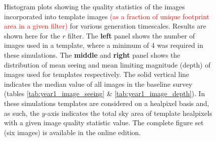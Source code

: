 \documentclass[preprintm,linenumbers]{aastex631}
\providecommand{\red}[1]{\textcolor{red}{#1}}
\begin{document}
\begin{figure}
\begin{tabular}{c c c}
			\end{tabular}
			\caption{
				Histogram plots showing the quality statistics of the images incorporated into template images \red{(as a fraction of unique footprint area in a given filter)} for various generation timescales.
				Results are shown here for the $r$ filter.
				The \textbf{left} panel shows the number of images used in a template, where a minimum of 4 was required in these simulations. %
				The \textbf{middle} and \textbf{right} panel shows the distribution of mean seeing and mean limiting magnitude (depth) of images used for templates respectively.
				The solid vertical line indicates the median value of all images in the baseline survey (tables \ref{tab:year1_image_seeing} \& \ref{tab:year1_image_depth}).
				In these simulations templates are considered on a healpixel basis and, as such, the $y$-axis indicates the total sky area of template healpixels with a given image quality statistic value. The complete figure set (six images) is available in the online edition.
			}
			\label{fig:template_image_histograms_tscale}
		\end{figure}
		
\end{document}
